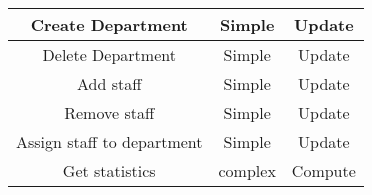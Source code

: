 \begin{table}[htdp]
\begin{center}
\begin{tabular}{|c|c|c|}
Create Department & Simple & Update \\ \hline%
Delete Department & Simple & Update \\ \hline%
Add staff & Simple & Update \\ \hline%
Remove staff & Simple & Update \\ \hline%
Assign staff to department & Simple & Update \\ \hline%
Get statistics & complex & Compute \\ \hline%

\end{tabular}
\end{center}
\label{tab:functionlist}
\end{table}

